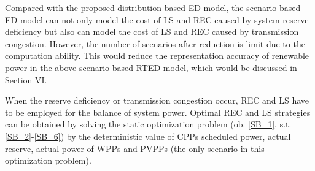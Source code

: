 
Compared with the proposed distribution-based ED model, the scenario-based ED model can not only model the cost of LS and REC caused by system reserve deficiency but also can model the cost of LS and REC caused by transmission congestion. However, the number of scenarios after reduction is limit due to the computation ability. This would reduce the representation accuracy of renewable power in the above scenario-based RTED model, which would be discussed in Section VI.

When the reserve deficiency or transmission congestion occur, REC and LS have to be employed for the balance of system power. Optimal REC and LS strategies can be obtained by solving the static optimization problem (ob. \eqref{SB_1}, s.t. {\eqref{SB_2}-\eqref{SB_6})} by the deterministic value of CPPs scheduled power, actual reserve, actual power of WPPs and PVPPs (the only scenario in this optimization problem).



